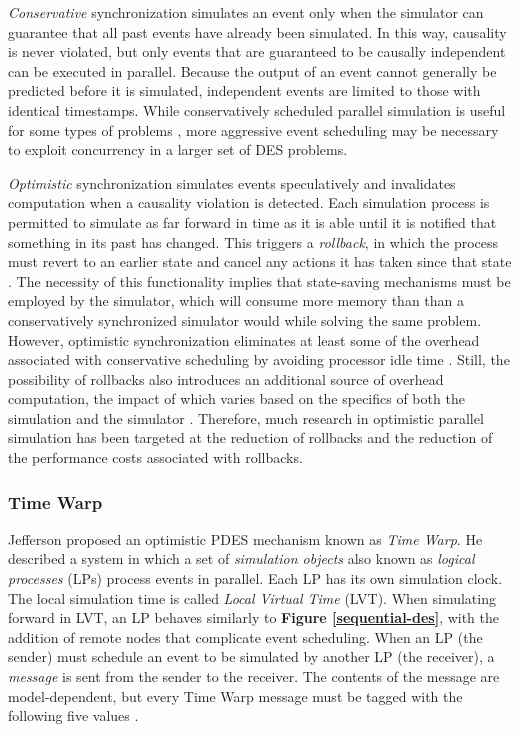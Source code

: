 \documentclass[11pt]{book}
\begin{document}
\textit{Conservative} synchronization simulates an event only when the simulator can
guarantee that all past events have already been simulated. In this way,
causality is never violated, but only events that are guaranteed to be causally
independent can be executed in parallel. Because the output of an event cannot
generally be predicted before it is simulated, independent events are limited to
those with identical timestamps. While conservatively scheduled parallel
simulation is useful for some types of problems \cite{nicol-93b}, more
aggressive event scheduling may be necessary to exploit concurrency in a larger
set of DES problems.

\textit{Optimistic} synchronization simulates events speculatively and invalidates
computation when a causality violation is detected. Each simulation process is
permitted to simulate as far forward in time as it is able until it is notified
that something in its past has changed. This triggers a \textit{rollback}, in
which the process must revert to an earlier state and cancel any actions it has
taken since that state \cite{nicol-93b}. The necessity of this functionality
implies that state-saving mechanisms must be employed by the simulator, which
will consume more memory than than a conservatively synchronized simulator would
while solving the same problem. However, optimistic synchronization eliminates at least some of the
overhead associated with conservative scheduling by avoiding processor idle time
\cite{nicol-93b}. Still, the possibility of rollbacks also introduces an
additional source of overhead computation, the impact of which varies based on
the specifics of both the simulation and the simulator
\cite{fujimoto-pdes}. Therefore, much research in optimistic parallel simulation
has been targeted at the reduction of rollbacks and the reduction of the
performance costs associated with rollbacks.

\subsubsection{\textbf{Time Warp}}
\label{time-warp}

Jefferson \cite{jefferson-85} proposed an optimistic PDES mechanism known as
\textit{Time Warp}. He described a system in which a set of \textit{simulation
  objects} also known as \textit{logical processes} (LPs) process events in
parallel. Each LP has its own simulation clock. The local simulation time is
called \textit{Local Virtual Time} (LVT). When simulating forward in LVT, an LP
behaves similarly to \textbf{Figure \ref{sequential-des}}, with the addition of
remote nodes that complicate event scheduling. When an LP (the sender) must
schedule an event to be simulated by another LP (the receiver), a
\textit{message} is sent from the sender to the receiver. The contents of the
message are model-dependent, but every Time Warp message must be tagged with the
following five values \cite{jefferson-85}.
\end{document}
